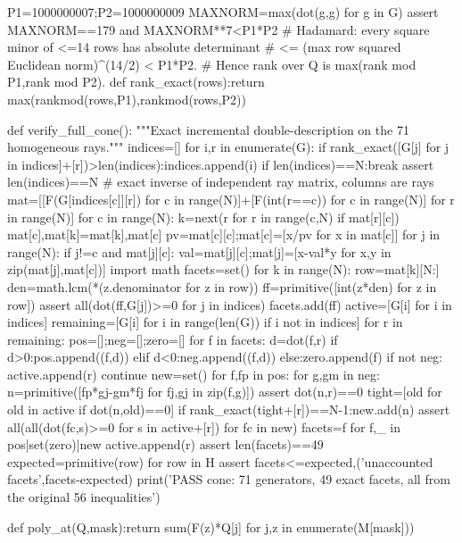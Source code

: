 \documentclass[UTF8,11pt,a4paper]{ctexart}
\begin{document}
\begin{CodeListing}
P1=1000000007;P2=1000000009
MAXNORM=max(dot(g,g) for g in G)
assert MAXNORM==179 and MAXNORM**7<P1*P2
# Hadamard: every square minor of <=14 rows has absolute determinant
# <= (max row squared Euclidean norm)^(14/2) < P1*P2.
# Hence rank over Q is max(rank mod P1,rank mod P2).
def rank_exact(rows):return max(rankmod(rows,P1),rankmod(rows,P2))


def verify_full_cone():
    """Exact incremental double-description on the 71 homogeneous rays."""
    indices=[]
    for i,r in enumerate(G):
        if rank_exact([G[j] for j in indices]+[r])>len(indices):indices.append(i)
        if len(indices)==N:break
    assert len(indices)==N
    # exact inverse of independent ray matrix, columns are rays
    mat=[[F(G[indices[c]][r]) for c in range(N)]+[F(int(r==c)) for c in range(N)] for r in range(N)]
    for c in range(N):
        k=next(r for r in range(c,N) if mat[r][c])
        mat[c],mat[k]=mat[k],mat[c]
        pv=mat[c][c];mat[c]=[x/pv for x in mat[c]]
        for j in range(N):
            if j!=c and mat[j][c]:
                val=mat[j][c];mat[j]=[x-val*y for x,y in zip(mat[j],mat[c])]
    import math
    facets=set()
    for k in range(N):
        row=mat[k][N:]
        den=math.lcm(*(z.denominator for z in row))
        ff=primitive([int(z*den) for z in row])
        assert all(dot(ff,G[j])>=0 for j in indices)
        facets.add(ff)
    active=[G[i] for i in indices]
    remaining=[G[i] for i in range(len(G)) if i not in indices]
    for r in remaining:
        pos=[];neg=[];zero=[]
        for f in facets:
            d=dot(f,r)
            if d>0:pos.append((f,d))
            elif d<0:neg.append((f,d))
            else:zero.append(f)
        if not neg:
            active.append(r)
            continue
        new=set()
        for f,fp in pos:
            for g,gm in neg:
                n=primitive([fp*gj-gm*fj for fj,gj in zip(f,g)])
                assert dot(n,r)==0
                tight=[old for old in active if dot(n,old)==0]
                if rank_exact(tight+[r])==N-1:new.add(n)
        assert all(all(dot(fc,s)>=0 for s in active+[r]) for fc in new)
        facets={f for f,_ in pos}|set(zero)|new
        active.append(r)
    assert len(facets)==49
    expected={primitive(row) for row in H}
    assert facets<=expected,('unaccounted facets',facets-expected)
    print('PASS cone: 71 generators, 49 exact facets, all from the original 56 inequalities')


def poly_at(Q,mask):return sum(F(z)*Q[j] for j,z in enumerate(M[mask]))



\end{CodeListing}
\end{document}

